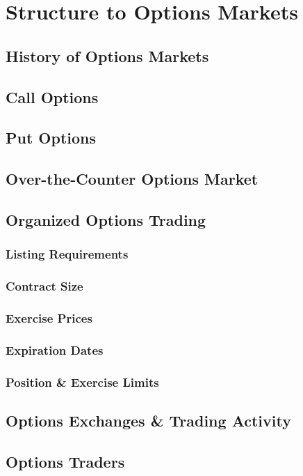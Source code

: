 \documentclass{book}
\theoremstyle{definition}
\theoremstyle{remark}
\begin{document}
\newpage
\section{Structure to Options Markets}
    \subsection{History of Options Markets}    
    \subsection{Call Options}
    \subsection{Put Options}
    \subsection{Over-the-Counter Options Market}
    \subsection{Organized Options Trading}
        \subsubsection{Listing Requirements}
        \subsubsection{Contract Size}
        \subsubsection{Exercise Prices}
        \subsubsection{Expiration Dates}
        \subsubsection{Position \& Exercise Limits}
    \subsection{Options Exchanges \& Trading Activity}
    \subsection{Options Traders}
\end{document}
